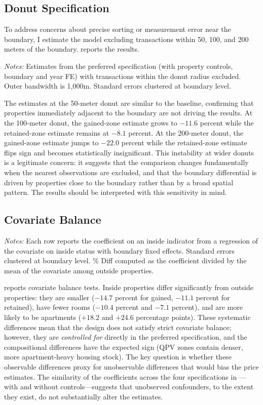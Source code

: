 \documentclass[12pt]{article}
\begin{document}
\subsection{Donut Specification}

To address concerns about precise sorting or measurement error near the boundary, I estimate the model excluding transactions within 50, 100, and 200 meters of the boundary.  reports the results.



\noindent\textit{Notes:} Estimates from the preferred specification (with property controls, boundary and year FE) with transactions within the donut radius excluded. Outer bandwidth is 1,000m. Standard errors clustered at boundary level.

The estimates at the 50-meter donut are similar to the baseline, confirming that properties immediately adjacent to the boundary are not driving the results. At the 100-meter donut, the gained-zone estimate grows to $-11.6$ percent while the retained-zone estimate remains at $-8.1$ percent. At the 200-meter donut, the gained-zone estimate jumps to $-22.0$ percent while the retained-zone estimate flips sign and becomes statistically insignificant. This instability at wider donuts is a legitimate concern: it suggests that the comparison changes fundamentally when the nearest observations are excluded, and that the boundary differential is driven by properties close to the boundary rather than by a broad spatial pattern. The results should be interpreted with this sensitivity in mind.

\subsection{Covariate Balance}



\noindent\textit{Notes:} Each row reports the coefficient on an inside indicator from a regression of the covariate on inside status with boundary fixed effects. Standard errors clustered at boundary level. \% Diff computed as the coefficient divided by the mean of the covariate among outside properties.

 reports covariate balance tests. Inside properties differ significantly from outside properties: they are smaller ($-14.7$ percent for gained, $-11.1$ percent for retained), have fewer rooms ($-10.4$ percent and $-7.1$ percent), and are more likely to be apartments ($+18.2$ and $+24.6$ percentage points). These systematic differences mean that the design does not satisfy strict covariate balance; however, they are \textit{controlled for} directly in the preferred specification, and the compositional differences have the expected sign (QPV zones contain denser, more apartment-heavy housing stock). The key question is whether these observable differences proxy for unobservable differences that would bias the price estimates. The similarity of the coefficients across the four specifications in ---with and without controls---suggests that unobserved confounders, to the extent they exist, do not substantially alter the estimates.
\end{document}
